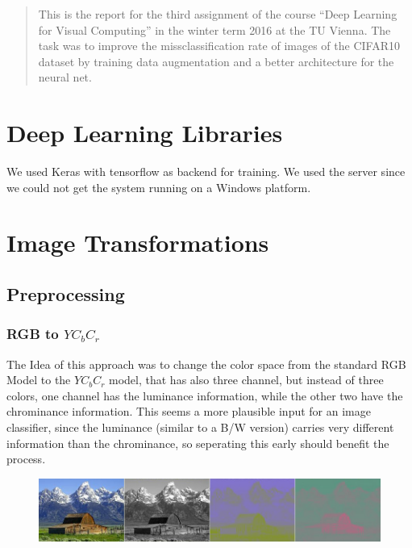 \newcommand{\ttitle}{Image Classification with CNN}
\hyphenation{}
\maketitle
\begin{abstract}
This is the report for the third assignment of the course ``Deep Learning for Visual Computing'' in the winter term 2016 at the TU Vienna. The task was to improve the missclassification rate of images of  the CIFAR10~\cite{CIFAR10} dataset by training data augmentation and a better architecture for the neural net.
\end{abstract}

\section{Deep Learning Libraries}
We used Keras with tensorflow as backend for training. We used the server since we could not get the system running on a Windows platform. 

\section{Image Transformations}
\subsection{Preprocessing}
\subsubsection{RGB to $YC_bC_r$}
The Idea of this approach was to change the color space from the standard RGB Model to the $YC_bC_r$ model, that has also three channel, but instead of three colors, one channel has the luminance information, while the other two have the chrominance information. This seems a more plausible input for an image classifier, since the luminance (similar to a B/W version) carries very different information than the chrominance, so seperating this early should benefit the process. 

\begin{figure}\centering
\includegraphics[width=1\textwidth]{./img/barn_rgb_ycc.jpg}
\end{figure}


